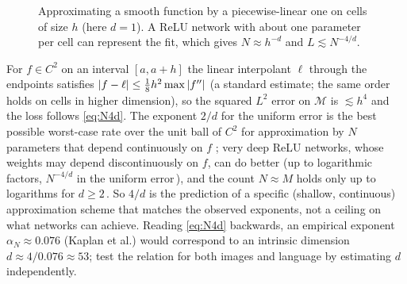 \begin{figure}[tb]
\centering
{}
\caption{Approximating a smooth function by a piecewise-linear one on cells of size $h$ (here $d=1$). A ReLU network with about one parameter per cell can represent the fit, which gives $N\approx h^{-d}$ and $L\lesssim N^{-4/d}$.}
\label{fig:L3-pl}
\end{figure}

\begin{beyond}
For $f\in C^2$ on an interval $[a,a+h]$ the linear interpolant $\ell$ through the endpoints satisfies $\left\lvert f-\ell\right\rvert\le\tfrac18h^2\max\left\lvert f''\right\rvert$ (a standard estimate; the same order holds on cells in higher dimension), so the squared $L^2$ error on $\mathcal M$ is $\lesssim h^4$ and the loss follows \eqref{eq:N4d}. The exponent $2/d$ for the uniform error is the best possible worst-case rate over the unit ball of $C^2$ for approximation by $N$ parameters that depend continuously on $f$ \citep{devore1989}; very deep ReLU networks, whose weights may depend discontinuously on $f$, can do better (up to logarithmic factors, $N^{-4/d}$ in the uniform error\,\citep{yarotsky2018}), and the count $N\approx M$ holds only up to logarithms for $d\ge2$\,\citep{yarotsky2017}. So $4/d$ is the prediction of a specific (shallow, continuous) approximation scheme that matches the observed exponents, not a ceiling on what networks can achieve.
Reading \eqref{eq:N4d} backwards, an empirical exponent $\alpha_N\approx0.076$ (Kaplan et al.) would correspond to an intrinsic dimension $d\approx4/0.076\approx53$; \citet{sharma2022} test the relation for both images and language by estimating $d$ independently.
\end{beyond}

